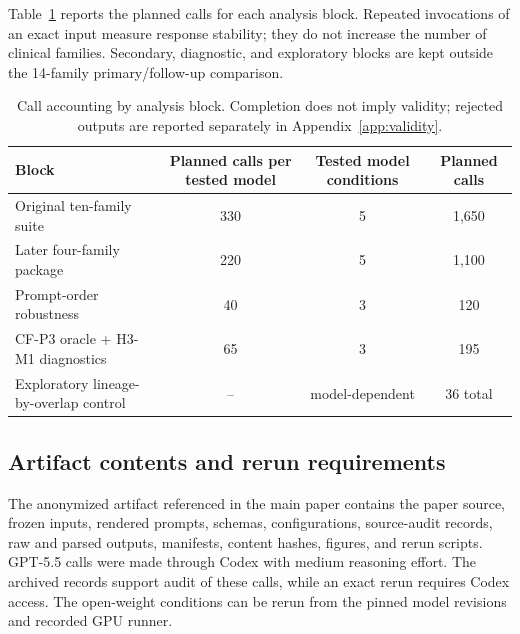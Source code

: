 \documentclass[11pt]{article}
\begin{document}
Table~\ref{tab:call-accounting} reports the planned calls for each analysis block. Repeated invocations of an exact input measure response stability; they do not increase the number of clinical families. Secondary, diagnostic, and exploratory blocks are kept outside the 14-family primary/follow-up comparison.

\begin{table}[t]
\centering
\small
\begin{tabular}{@{}lccc@{}}
\toprule
Block & Planned calls per tested model & Tested model conditions & Planned calls \\
\midrule
Original ten-family suite & 330 & 5 & 1,650 \\
Later four-family package & 220 & 5 & 1,100 \\
Prompt-order robustness & 40 & 3 & 120 \\
CF-P3 oracle + H3-M1 diagnostics & 65 & 3 & 195 \\
Exploratory lineage-by-overlap control & -- & model-dependent & 36 total \\
\bottomrule
\end{tabular}
\caption{Call accounting by analysis block. Completion does not imply validity; rejected outputs are reported separately in Appendix~\ref{app:validity}.}
\label{tab:call-accounting}
\end{table}

\subsection{Artifact contents and rerun requirements}

The anonymized artifact referenced in the main paper contains the paper source, frozen inputs, rendered prompts, schemas, configurations,
source-audit records, raw and parsed outputs, manifests, content hashes, figures, and rerun scripts. GPT-5.5 calls were made through Codex with medium reasoning effort. The archived records support audit of these calls, while an exact rerun
requires Codex access. The open-weight conditions can be rerun from the pinned model revisions and recorded GPU runner.

\clearpage
\end{document}
